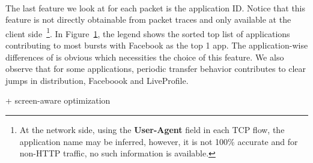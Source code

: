 \begin{figure}[h]
\centering
{} \\
\label{fig:appid1}
\end{figure}
The last feature we look at for each packet is the application ID. Notice that this feature is not directly obtainable from packet traces and only available at the client side~\footnote{At the network side, using the \textbf{User-Agent} field in each TCP flow, the application name may be inferred, however, it is not 100\% accurate and for non-HTTP traffic, no such information is available.}. In Figure~\ref{fig:appid1}, the legend shows the sorted top list of applications contributing to most bursts with Facebook as the top 1 app. The application-wise differences of \IBT is obvious which necessities the choice of this feature. We also observe that for some applications, periodic transfer behavior contributes to clear jumps in \IBT distribution, \eg Faceboook and LiveProfile.





	+ screen-aware optimization
